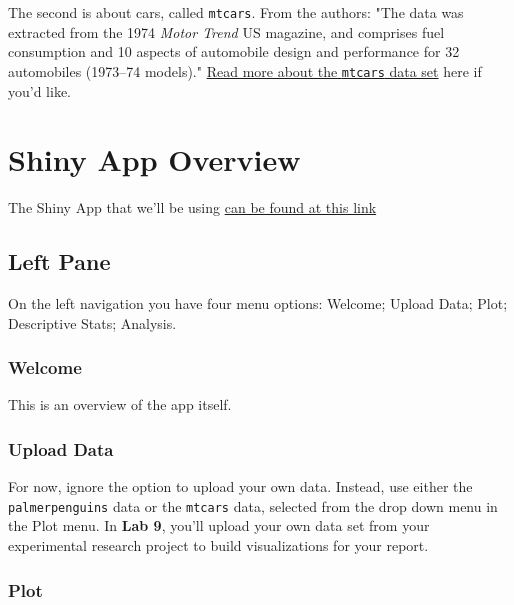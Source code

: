 \documentclass[
]{book}
\begin{document}
The second is about cars, called \texttt{mtcars}. From the authors: "The data was extracted from the 1974 \emph{Motor Trend} US magazine, and comprises fuel consumption and 10 aspects of automobile design and performance for 32 automobiles (1973--74 models)." \href{https://stat.ethz.ch/R-manual/R-devel/library/datasets/html/mtcars.html}{Read more about the \texttt{mtcars} data set} here if you'd like.

\hypertarget{shiny-app-overview}{%
\chapter*{Shiny App Overview}\label{shiny-app-overview}}

The Shiny App that we'll be using \href{https://openscience.ok.ubc.ca/shiny/BIOL-116/}{can be found at this link}

\hypertarget{left-pane}{%
\section*{Left Pane}\label{left-pane}}

On the left navigation you have four menu options: Welcome; Upload Data; Plot; Descriptive Stats; Analysis.

\hypertarget{welcome-1}{%
\subsection*{Welcome}\label{welcome-1}}

This is an overview of the app itself.

\hypertarget{upload-data}{%
\subsection*{Upload Data}\label{upload-data}}

For now, ignore the option to upload your own data. Instead, use either the \texttt{palmerpenguins} data or the \texttt{mtcars} data, selected from the drop down menu in the Plot menu. In \textbf{Lab 9}, you'll upload your own data set from your experimental research project to build visualizations for your report.

\hypertarget{plot}{%
\subsection*{Plot}\label{plot}}
\end{document}
